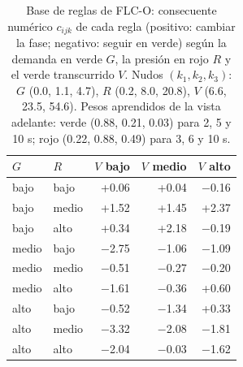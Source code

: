 \begin{table}[t]
\centering
\caption{Base de reglas de FLC-O: consecuente num\'erico $c_{ijk}$ de cada regla (positivo: cambiar la fase; negativo: seguir en verde) seg\'un la demanda en verde $G$, la presi\'on en rojo $R$ y el verde transcurrido $V$. Nudos $(k_1,k_2,k_3)$: $G$ (0.0, 1.1, 4.7), $R$ (0.2, 8.0, 20.8), $V$ (6.6, 23.5, 54.6). Pesos aprendidos de la vista adelante: verde (0.88, 0.21, 0.03) para 2, 5 y 10 s; rojo (0.22, 0.88, 0.49) para 3, 6 y 10 s.}
\label{tab:reglasflc}
\scriptsize
\begin{tabular}{@{}llrrr@{}}
\toprule
$G$ & $R$ & $V$ bajo & $V$ medio & $V$ alto \\
\midrule
bajo & bajo & +0.06 & +0.04 & $-$0.16 \\
bajo & medio & +1.52 & +1.45 & +2.37 \\
bajo & alto & +0.34 & +2.18 & $-$0.19 \\
medio & bajo & $-$2.75 & $-$1.06 & $-$1.09 \\
medio & medio & $-$0.51 & $-$0.27 & $-$0.20 \\
medio & alto & $-$1.61 & $-$0.36 & +0.60 \\
alto & bajo & $-$0.52 & $-$1.34 & +0.33 \\
alto & medio & $-$3.32 & $-$2.08 & $-$1.81 \\
alto & alto & $-$2.04 & $-$0.03 & $-$1.62 \\
\bottomrule
\end{tabular}
\end{table}
